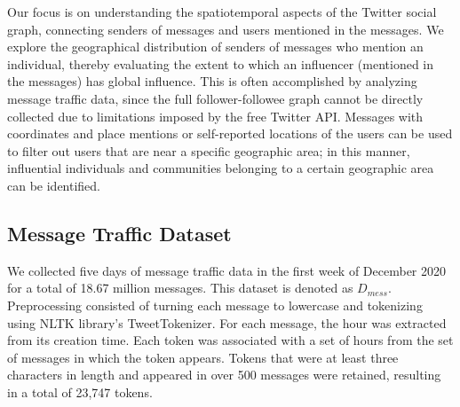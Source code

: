 Our focus is on understanding the  spatiotemporal aspects of the
 Twitter social graph, 
 connecting senders of messages and users mentioned in the messages. 
We explore the geographical distribution of senders of 
 messages who mention an individual, 
 thereby evaluating the extent to which an influencer (mentioned in the messages) has global influence.
This is often accomplished by analyzing 
 message traffic data, since the full follower-followee
graph cannot be directly collected due to limitations imposed by the free Twitter API.
Messages with coordinates and place mentions or self-reported locations of the users can be used to filter out users that are near a specific geographic area; in this manner, influential individuals and communities belonging to a certain geographic area can be identified.  

\subsection{Message Traffic Dataset}
We collected five days of message traffic data in the first week of December 2020 for a total of 18.67 million messages. This dataset is denoted as $D_{mess}$. Preprocessing consisted of turning each message to lowercase and tokenizing using NLTK library's TweetTokenizer. For each message, the hour was extracted from its creation time. Each token was associated with a set of hours from the set of messages in which the token appears. Tokens that were at least three characters in length and appeared in over 500 messages were retained, resulting in a total of 23,747 tokens.

